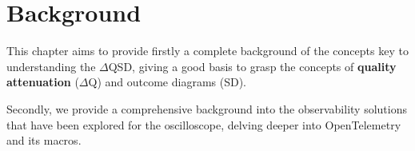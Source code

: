 \chapter{Background}
    This chapter aims to provide firstly a complete background of the concepts key to understanding the $\Delta$QSD, giving a good basis to grasp the concepts of \textbf{quality attenuation} ($\Delta$Q) and outcome diagrams (SD). 
    
    Secondly, we provide a comprehensive background into the observability solutions that have been explored for the oscilloscope, delving deeper into OpenTelemetry and its macros.

    
    
    
